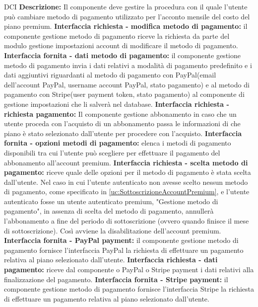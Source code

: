 \begin{listaPersonale}{DCI}
    \textbf{Descrizione:} Il componente deve gestire la procedura con il quale l'utente può cambiare metodo di pagamento utilizzato per l'acconto mensile del costo del piano premium.
    \textbf{Interfaccia richiesta - modifica metodo di pagamento:} il componente gestione metodo di pagamento riceve la richiesta da parte del modulo gestione impostazioni account di modificare il metodo di pagamento.
    \textbf{Interfaccia fornita - dati metodo di pagamento:} il componente gestione metodo di pagamento invia i dati relativi a modalità di pagamento predefinito e i dati aggiuntivi riguardanti al metodo di pagamento con PayPal(email dell'account PayPal, username account PayPal, stato pagamento) e al metodo di pagamento con Stripe(user payment token, stato pagamento) al componente di gestione impostazioni che li salverà nel database.
    \textbf{Interfaccia richiesta - richiesta pagamento:} Il componente gestione abbonamento in caso che un utente proceda con l'acquisto di un abbonamento passa le informazioni di che piano è stato selezionato dall'utente per procedere con l'acquisto.
    \textbf{Interfaccia fornita - opzioni metodi di pagamento:} elenca i metodi di pagamento disponibili tra cui l'utente può scegliere per effettuare il pagamento del abbonamento all'account premium.
    \textbf{Interfaccia richiesta - scelta metodo di pagamento:} riceve quale delle opzioni per il metodo di pagamento è stata scelta dall'utente. Nel caso in cui l'utente autenticato non avesse scelto nessun metodo di pagamento, come specificato in \ref{uc:SottoscrizioneAccountPremium}, e l'utente autenticato fosse un utente autenticato premium, "Gestione metodo di pagamento", in assenza di scelta del metodo di pagamento, annullerà l'abbonamento a fine del periodo di sottoscrizione (ovvero quando finisce il mese di sottoscrizione). Così avviene la disabilitazione dell'account premium.
    \textbf{Interfaccia fornita - PayPal payment:} il componente gestione metodo di pagamento fornisce l'interfaccia PayPal la richiesta di effettuare un pagamento relativa al piano selezionato dall'utente.
    \textbf{Interfaccia richiesta - dati pagamento:} riceve dal componente o PayPal o Stripe payment i dati relativi alla finalizzazione del pagamento.
    \textbf{Interfaccia fornita - Stripe payment:}  il componente gestione metodo di pagamento fornisce l'interfaccia Stripe la richiesta di effettuare un pagamento relativa al piano selezionato dall'utente.



\end{listaPersonale}
